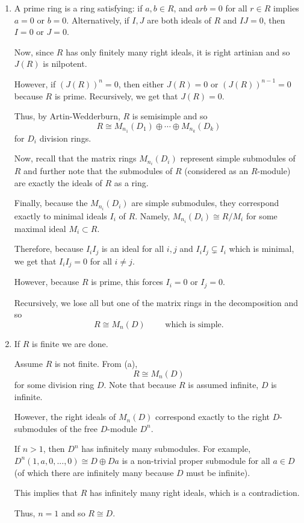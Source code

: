 \documentclass[12pt]{Qual}
\begin{document}
\begin{solution}$\,$
\begin{enumerate}[label=(\alph*)]
    \item A prime ring is a ring satisfying: if $a,b\in R$, and $arb=0$ for all $r\in R$ implies $a=0$ or $b=0.$ Alternatively, if $I,J$ are both ideals of $R$ and $IJ=0$, then $I=0$ or $J=0.$

    Now, since $R$ has only finitely many right ideals, it is right artinian and so $J(R)$ is nilpotent.

    However, if $(J(R))^n=0$, then either $J(R)=0$ or $(J(R))^{n-1}=0$ because $R$ is prime. Recursively, we get that $J(R)=0.$

    Thus, by Artin-Wedderburn, $R$ is semisimple and so $$R\cong M_{n_1}(D_1)\oplus\cdots\oplus M_{n_k}(D_k)$$ for $D_i$ division rings.

    Now, recall that the matrix rings $M_{n_i}(D_i)$ represent simple submodules of $R$ and further note that the submodules of $R$ (considered as an $R$-module) are exactly the ideals of $R$ as a ring.

    Finally, because the $M_{n_i}(D_i)$ are simple submodules, they correspond exactly to minimal ideals $I_i$ of $R$. Namely, $M_{n_i}(D_i)\cong R/M_i$ for some maximal ideal $M_i\subset R$.

    Therefore, because $I_iI_j$ is an ideal for all $i,j$ and $I_iI_j\subsetneq I_i$ which is minimal, we get that $I_iI_j=0$ for all $i\not=j.$

    However, because $R$ is prime, this forces $I_i=0$ or $I_j=0$.

    Recursively, we lose all but one of the matrix rings in the decomposition and so $$R\cong M_n(D)\qquad\text{ which is simple.}$$

    \item If $R$ is finite we are done.

    Assume $R$ is not finite. From (a), $$R\cong M_n(D)$$ for some division ring $D$. Note that because $R$ is assumed infinite, $D$ is infinite.

    However, the right ideals of $M_n(D)$ correspond exactly to the right $D$-submodules of the free $D$-module $D^n.$ %

    If $n>1$, then $D^n$ has infinitely many submodules. For example, $D^n(1,a,0,...,0)\cong D\oplus Da$ is a non-trivial proper submodule for all $a\in D$ (of which there are infinitely many because $D$ must be infinite).

    This implies that $R$ has infinitely many right ideals, which is a contradiction.

    Thus, $n=1$ and so $R\cong D.$
\end{enumerate}
\end{solution}
\newpage
\end{document}

